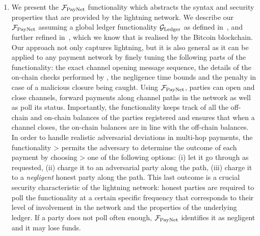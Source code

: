 \begin{enumerate}
\item We present the $\mathcal{F}_{\mathrm{PayNet}}{}$ functionality which abstracts the syntax and
security properties that are provided by the lightning network. We describe our
$\mathcal{F}_{\mathrm{PayNet}}{}$ assuming a global ledger functionality $\mathcal{G}_{\mathrm{Ledger}}$ as defined
in~\cite{BMTZ17}, and further refined in~\cite{genesis}, which we know that is
realised by the Bitcoin blockchain. Our approach not only captures lightning,
but it is also general as it can be applied to any payment network by finely
tuning the following parts of the functionality: the exact channel
opening message sequence, the details of the on-chain checks performed by
\fpaynet, the negligence time bounds and the penalty in case of a malicious
closure being caught. Using $\mathcal{F}_{\mathrm{PayNet}}{}$, parties can open and close channels,
forward payments along channel paths in the network as well as poll its status.
Importantly, the functionality keeps track of all the off-chain and on-chain
balances of the parties registered and ensures that when a channel closes, the on-chain balances
are in line with the off-chain balances. In order to handle
realistic adversarial deviations in multi-hop payments, the functionality
> permits the adversary to determine the outcome of each payment by choosing
> one of the following options: (i) let it go through as requested, (ii) charge it to an adversarial
party along the path, (iii) charge it to a \emph{negligent} honest party along
the path. This last outcome is a crucial security characteristic of the
lightning network: honest parties are required to poll the
functionality at a certain specific frequency that corresponds to their level of
involvement in the network and the properties of the underlying ledger. If a
party does not poll often enough, $\mathcal{F}_{\mathrm{PayNet}}{}$ identifies it as
negligent and it may lose funds.


\end{enumerate}
